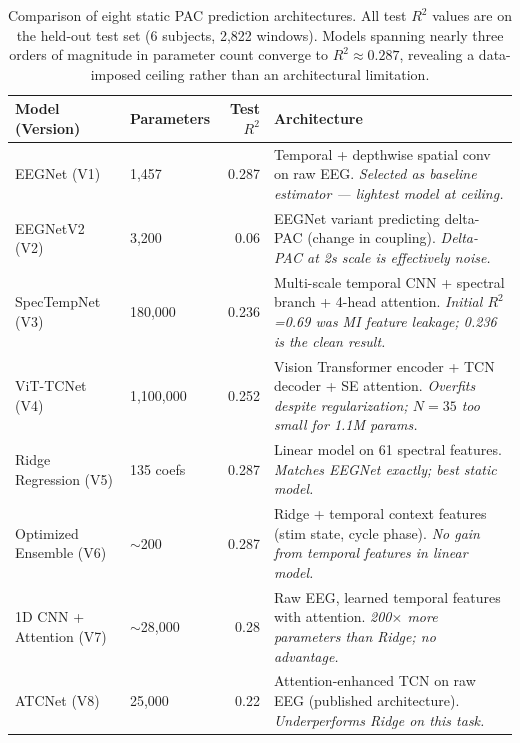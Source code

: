 \documentclass[11pt,letterpaper]{article}
\begin{document}
\begin{table}[htbp]
\centering
\caption{Comparison of eight static PAC prediction architectures. All test $R^2$ values are on the held-out test set (6 subjects, 2,822 windows). Models spanning nearly three orders of magnitude in parameter count converge to $R^2 \approx 0.287$, revealing a data-imposed ceiling rather than an architectural limitation.}
\label{tab:arch_search}
\small
\begin{tabularx}{\textwidth}{@{}l l r X@{}}
\toprule
\textbf{Model (Version)} & \textbf{Parameters} & \textbf{Test $R^2$} & \textbf{Architecture} \\
\midrule
EEGNet (V1) & 1,457 & 0.287 & Temporal + depthwise spatial conv on raw EEG. \textit{Selected as baseline estimator --- lightest model at ceiling.} \\[4pt]
EEGNetV2 (V2) & 3,200 & 0.06 & EEGNet variant predicting delta-PAC (change in coupling). \textit{Delta-PAC at 2s scale is effectively noise.} \\[4pt]
SpecTempNet (V3) & 180,000 & 0.236 & Multi-scale temporal CNN + spectral branch + 4-head attention. \textit{Initial $R^2$=0.69 was MI feature leakage; 0.236 is the clean result.} \\[4pt]
ViT-TCNet (V4) & 1,100,000 & 0.252 & Vision Transformer encoder + TCN decoder + SE attention. \textit{Overfits despite regularization; $N = 35$ too small for 1.1M params.} \\[4pt]
Ridge Regression (V5) & 135 coefs & 0.287 & Linear model on 61 spectral features. \textit{Matches EEGNet exactly; best static model.} \\[4pt]
Optimized Ensemble (V6) & $\sim$200 & 0.287 & Ridge + temporal context features (stim state, cycle phase). \textit{No gain from temporal features in linear model.} \\[4pt]
1D CNN + Attention (V7) & $\sim$28,000 & 0.28 & Raw EEG, learned temporal features with attention. \textit{200$\times$ more parameters than Ridge; no advantage.} \\[4pt]
ATCNet (V8) & 25,000 & 0.22 & Attention-enhanced TCN on raw EEG (published architecture). \textit{Underperforms Ridge on this task.} \\
\bottomrule
\end{tabularx}
\end{table}
\end{document}
